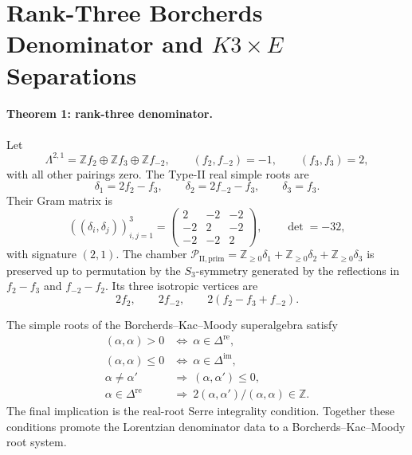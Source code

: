 
\providecommand{\CC}{\mathbb{C}}
\providecommand{\ZZ}{\mathbb{Z}}
\providecommand{\RR}{\mathbb{R}}
\providecommand{\NN}{\mathbb{N}}
\providecommand{\Delaf}{\Delta_{5}}
\providecommand{\LamII}{\Lambda^{2,1}_{\mathrm{II}}}
\providecommand{\gbkm}{\mathfrak{g}_{\Delta_{5}}}
\providecommand{\smult}{\operatorname{smult}}
\providecommand{\CoHA}{\operatorname{CoHA}}
\providecommand{\Pii}{\mathcal{P}_{\mathrm{II}}}
\providecommand{\Piprim}{\mathcal{P}_{\mathrm{II},\mathrm{prim}}}
\providecommand{\kBKM}{\kappa_{\mathrm{BKM}}}

\section*{Rank-Three Borcherds Denominator and \(K3\times E\) Separations}

\paragraph{Theorem 1: rank-three denominator.}
Let
\[
  \Lambda^{2,1}=\ZZ f_2\oplus\ZZ f_3\oplus\ZZ f_{-2},
  \qquad
  (f_2,f_{-2})=-1,\qquad (f_3,f_3)=2,
\]
with all other pairings zero. The Type-II real simple roots are
\[
  \delta_1=2f_2-f_3,\qquad
  \delta_2=2f_{-2}-f_3,\qquad
  \delta_3=f_3 .
\]
Their Gram matrix is
\[
  ((\delta_i,\delta_j))_{i,j=1}^{3}
  =
  \begin{pmatrix}
    2&-2&-2\\
    -2&2&-2\\
    -2&-2&2
  \end{pmatrix},
  \qquad \det=-32,
\]
with signature \((2,1)\). The chamber
\(\Piprim=\ZZ_{\geq0}\delta_1+\ZZ_{\geq0}\delta_2+\ZZ_{\geq0}\delta_3\)
is preserved up to permutation by the \(S_3\)-symmetry generated by the
reflections in \(f_2-f_3\) and \(f_{-2}-f_2\). Its three isotropic
vertices are
\[
  2f_2,\qquad 2f_{-2},\qquad 2(f_2-f_3+f_{-2}).
\]

The simple roots of the Borcherds--Kac--Moody superalgebra satisfy
\[
\begin{array}{ll}
(\alpha,\alpha)>0 &\Longleftrightarrow\ \alpha\in\Delta^{\mathrm{re}},\\
(\alpha,\alpha)\leq0 &\Longleftrightarrow\ \alpha\in\Delta^{\mathrm{im}},\\
\alpha\neq\alpha' &\Longrightarrow\ (\alpha,\alpha')\leq0,\\
\alpha\in\Delta^{\mathrm{re}} &\Longrightarrow\
  2(\alpha,\alpha')/(\alpha,\alpha)\in\ZZ .
\end{array}
\]
The final implication is the real-root Serre integrality condition.
Together these conditions promote the Lorentzian denominator data to a
Borcherds--Kac--Moody root system.

